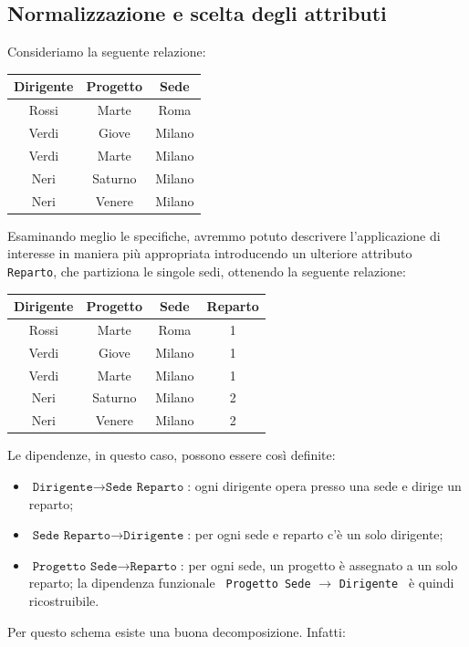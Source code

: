 \documentclass[12pt]{report}
\begin{document}
	\subsection{Normalizzazione e scelta degli attributi}
	Consideriamo la seguente relazione:
	\begin{center}
		\begin{tabular}{|c|c|c|}
			\hline
			Dirigente & Progetto & Sede \\
			\hline
			Rossi & Marte & Roma \\
			Verdi & Giove & Milano \\
			Verdi & Marte & Milano \\
			Neri & Saturno & Milano \\
			Neri & Venere & Milano \\
			\hline
		\end{tabular}
	\end{center}
	Esaminando meglio le specifiche, avremmo potuto descrivere l'applicazione di interesse in maniera più appropriata introducendo un ulteriore attributo \texttt{ Reparto}, che partiziona le singole sedi, ottenendo la seguente relazione:
	\begin{center}
		\begin{tabular}{|c|c|c|c|}
			\hline
			Dirigente & Progetto & Sede & Reparto \\
			\hline
			Rossi & Marte & Roma & 1\\
			Verdi & Giove & Milano & 1\\
			Verdi & Marte & Milano & 1\\
			Neri & Saturno & Milano & 2\\
			Neri & Venere & Milano & 2\\
			\hline
		\end{tabular}
	\end{center}
	Le dipendenze, in questo caso, possono essere così definite:
	\begin{itemize}
		\item $\texttt{Dirigente} \to \texttt{Sede Reparto}$: ogni dirigente opera presso una sede e dirige un reparto;
		\item $\texttt{Sede Reparto} \to \texttt{Dirigente}$: per ogni sede e reparto c'è un solo dirigente;
		\item $\texttt{Progetto Sede} \to \texttt{Reparto}$: per ogni sede, un progetto è assegnato a un solo reparto; la dipendenza funzionale \texttt{ Progetto Sede} $\to$ \texttt{Dirigente } è quindi ricostruibile.
	\end{itemize}
	Per questo schema esiste una buona decomposizione. Infatti:
\end{document}

